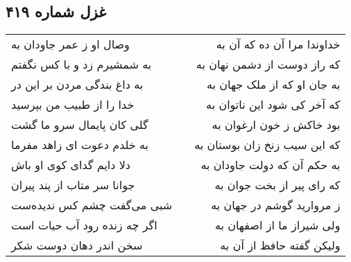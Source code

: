 \begin{center}
\section*{غزل شماره ۴۱۹}
\label{sec:sh419}
\begin{longtable}{l p{0.5cm} r}
وصال او ز عمر جاودان به
&&
خداوندا مرا آن ده که آن به
\\
به شمشیرم زد و با کس نگفتم
&&
که راز دوست از دشمن نهان به
\\
به داغ بندگی مردن بر این در
&&
به جان او که از ملک جهان به
\\
خدا را از طبیب من بپرسید
&&
که آخر کی شود این ناتوان به
\\
گلی کان پایمال سرو ما گشت
&&
بود خاکش ز خون ارغوان به
\\
به خلدم دعوت ای زاهد مفرما
&&
که این سیب زنخ زان بوستان به
\\
دلا دایم گدای کوی او باش
&&
به حکم آن که دولت جاودان به
\\
جوانا سر متاب از پند پیران
&&
که رای پیر از بخت جوان به
\\
شبی می‌گفت چشم کس ندیده‌ست
&&
ز مروارید گوشم در جهان به
\\
اگر چه زنده رود آب حیات است
&&
ولی شیراز ما از اصفهان به
\\
سخن اندر دهان دوست شکر
&&
ولیکن گفته حافظ از آن به
\\
\end{longtable}
\end{center}
